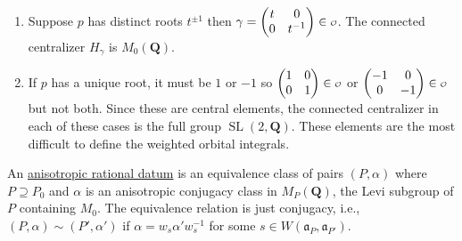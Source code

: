 \documentclass[11pt]{amsart}
\def\Q{\mathbf Q}
\def\O{\mathcal O}
\def\o{\scalebox{0.8}{$\scriptstyle\mathcal{O}$}}
\def\aaa{\mathfrak a}
\def\gl{\operatorname{GL}}
\def\sl{\operatorname{SL}}
\theoremstyle{remark}
\begin{document}
{\begin{enumerate}
		\[ N_{L/\Q} : L^* \to \Q^*. \]
		This is not surjective. In fact the index of the image in $\Q^*$ is infinite (see \cite{MR1068677}). Thus every such $\o \in \O^{\gl(2)}$ is a disjoint union of infinitely many classes $\o \in \O^{\sl(2)}$. Take one such class $\o \in \O^{\sl(2)}$ and $\gamma \in \o$, say $\gamma = \begin{pmatrix} 5 & 3 \\ 3 & 2 \end{pmatrix}$. The (connected) centralizer of $\gamma$ is an anisotropic torus so consists only of semisimple elements. In our example, 
		\[ H_\gamma = \left\{ \begin{pmatrix} a & b \\ b & a - b \end{pmatrix} : a, b \in \Q^*, a^2 - ab - b^2 = 1 \right\}. \]
		There is no $\Q$-split torus inside $H_\gamma$ so this equals $A_G$ and Arthur defines such classes as \underline{anisotropic}. They are the easiest to deal with, as we will see. 
	\item Suppose $p$ has distinct roots $t^{\pm 1}$ then $\gamma = \begin{pmatrix} t & 0 \\ 0 & t^{-1} \end{pmatrix} \in \o$. The connected centralizer $H_\gamma$ is $M_0(\Q)$. 
	\item If $p$ has a unique root, it must be $1$ or $-1$ so $\begin{pmatrix} 1 & 0 \\ 0 & 1 \end{pmatrix} \in \o$ or $\begin{pmatrix} -1 & 0 \\ 0 & -1 \end{pmatrix} \in \o$ but not both. Since these are central elements, the connected centralizer in each of these cases is the full group $\sl(2, \Q)$. These elements are the most difficult to define the weighted orbital integrals. 
\end{enumerate}
}

An \underline{anisotropic rational datum} is an equivalence class of pairs $(P, \alpha)$ where $P \supseteq P_0$ and $\alpha$ is an anisotropic conjugacy class in $M_P(\Q)$, the Levi subgroup of $P$ containing $M_0$. The equivalence relation is just conjugacy, i.e., $(P, \alpha) \sim (P', \alpha')$ if $\alpha = w_s \alpha' w_s^{-1}$ for some $s \in W(\aaa_P, \aaa_{P'})$. 
\end{document}
